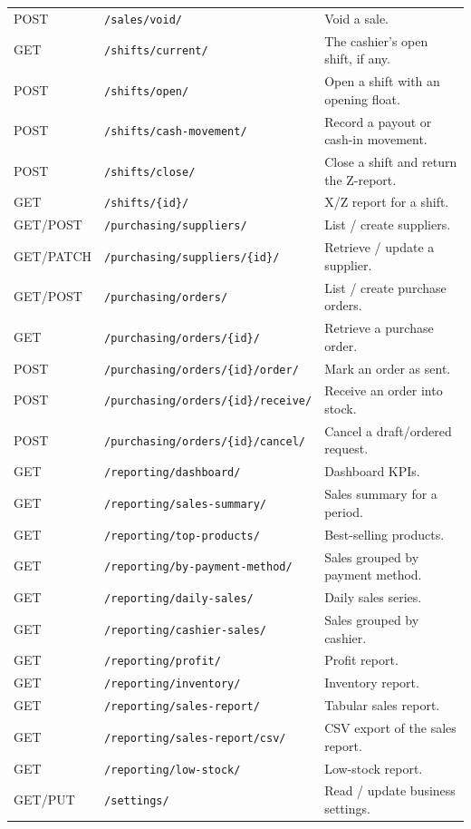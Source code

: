 \documentclass[11pt,a4paper]{article}
\begin{document}
\begin{longtable}{@{}p{}p{}p{}@{}}
POST & \texttt{/sales/void/} & Void a sale. \\
GET & \texttt{/shifts/current/} & The cashier's open shift, if any. \\
POST & \texttt{/shifts/open/} & Open a shift with an opening float. \\
POST & \texttt{/shifts/cash-movement/} & Record a payout or cash-in movement. \\
POST & \texttt{/shifts/close/} & Close a shift and return the Z-report. \\
GET & \texttt{/shifts/\{id\}/} & X/Z report for a shift. \\
GET/POST & \texttt{/purchasing/suppliers/} & List / create suppliers. \\
GET/PATCH & \texttt{/purchasing/suppliers/\{id\}/} & Retrieve / update a supplier. \\
GET/POST & \texttt{/purchasing/orders/} & List / create purchase orders. \\
GET & \texttt{/purchasing/orders/\{id\}/} & Retrieve a purchase order. \\
POST & \texttt{/purchasing/orders/\{id\}/order/} & Mark an order as sent. \\
POST & \texttt{/purchasing/orders/\{id\}/receive/} & Receive an order into stock. \\
POST & \texttt{/purchasing/orders/\{id\}/cancel/} & Cancel a draft/ordered request. \\
GET & \texttt{/reporting/dashboard/} & Dashboard KPIs. \\
GET & \texttt{/reporting/sales-summary/} & Sales summary for a period. \\
GET & \texttt{/reporting/top-products/} & Best-selling products. \\
GET & \texttt{/reporting/by-payment-method/} & Sales grouped by payment method. \\
GET & \texttt{/reporting/daily-sales/} & Daily sales series. \\
GET & \texttt{/reporting/cashier-sales/} & Sales grouped by cashier. \\
GET & \texttt{/reporting/profit/} & Profit report. \\
GET & \texttt{/reporting/inventory/} & Inventory report. \\
GET & \texttt{/reporting/sales-report/} & Tabular sales report. \\
GET & \texttt{/reporting/sales-report/csv/} & CSV export of the sales report. \\
GET & \texttt{/reporting/low-stock/} & Low-stock report. \\
GET/PUT & \texttt{/settings/} & Read / update business settings. \\
\bottomrule
\end{longtable}
\end{document}
